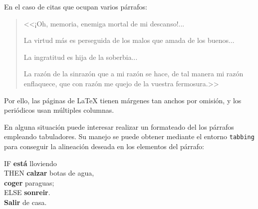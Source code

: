 \documentclass[11pt,a4paper]{report}
\begin{document}
\noindent En el caso de citas que ocupan varios párrafos:

\begin{quotation}
<<¡Oh, memoria, enemiga mortal de mi descanso!...

La virtud más es perseguida de los malos que amada de los buenos...

La ingratitud es hija de la soberbia...

La razón de la sinrazón que a mi razón se hace, de tal manera mi razón enflaquece, que con razón me quejo de la vuestra fermosura.>>
\end{quotation}

Por ello, las páginas de \LaTeX{} tienen márgenes tan anchos por omisión, y los periódicos usan múltiples columnas. 

En alguna situación puede interesar realizar un formateado del los párrafos empleando tabuladores. Su manejo se puede obtener mediante el entorno \texttt{tabbing} para conseguir la alineación deseada en los elementos del párrafo:

\begin{tabbing}
IF	\= \textbf{está} lloviendo                \\
    \> THEN \= \textbf{calzar} botas de agua, \\
    \>      \> \textbf{coger} paraguas;       \\
    \> ELSE \> \textbf{sonreir}.              \\
\textbf{Salir} de casa.
\end{tabbing}
\end{document}
